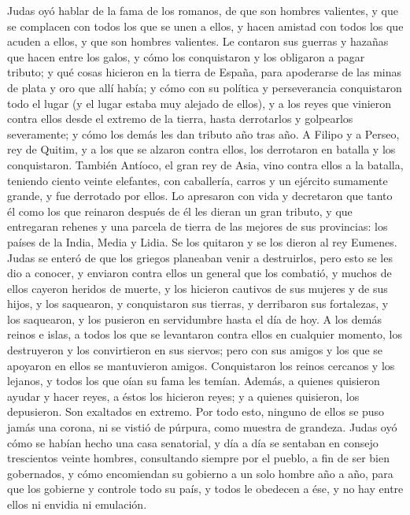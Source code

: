  Judas oyó hablar de la fama de los romanos, de que son
hombres valientes, y que se complacen con todos los que se unen a ellos,
y hacen amistad con todos los que acuden a ellos,  y que
son hombres valientes. Le contaron sus guerras y hazañas que hacen entre
los galos, y cómo los conquistaron y los obligaron a pagar tributo;
 y qué cosas hicieron en la tierra de España, para
apoderarse de las minas de plata y oro que allí había;  y
cómo con su política y perseverancia conquistaron todo el lugar (y el
lugar estaba muy alejado de ellos), y a los reyes que vinieron contra
ellos desde el extremo de la tierra, hasta derrotarlos y golpearlos
severamente; y cómo los demás les dan tributo año tras año.
 A Filipo y a Perseo, rey de Quitim, y a los que se
alzaron contra ellos, los derrotaron en batalla y los conquistaron.
 También Antíoco, el gran rey de Asia, vino contra ellos a
la batalla, teniendo ciento veinte elefantes, con caballería, carros y
un ejército sumamente grande, y fue derrotado por ellos. 
Lo apresaron con vida y decretaron que tanto él como los que reinaron
después de él les dieran un gran tributo, y que entregaran rehenes y una
parcela de tierra de las mejores de sus provincias:  los
países de la India, Media y Lidia. Se los quitaron y se los dieron al
rey Eumenes.  Judas se enteró de que los griegos planeaban
venir a destruirlos,  pero esto se les dio a conocer, y
enviaron contra ellos un general que los combatió, y muchos de ellos
cayeron heridos de muerte, y los hicieron cautivos de sus mujeres y de
sus hijos, y los saquearon, y conquistaron sus tierras, y derribaron sus
fortalezas, y los saquearon, y los pusieron en servidumbre hasta el día
de hoy.  A los demás reinos e islas, a todos los que se
levantaron contra ellos en cualquier momento, los destruyeron y los
convirtieron en sus siervos;  pero con sus amigos y los
que se apoyaron en ellos se mantuvieron amigos. Conquistaron los reinos
cercanos y los lejanos, y todos los que oían su fama les temían.
 Además, a quienes quisieron ayudar y hacer reyes, a
éstos los hicieron reyes; y a quienes quisieron, los depusieron. Son
exaltados en extremo.  Por todo esto, ninguno de ellos se
puso jamás una corona, ni se vistió de púrpura, como muestra de
grandeza.  Judas oyó cómo se habían hecho una casa
senatorial, y día a día se sentaban en consejo trescientos veinte
hombres, consultando siempre por el pueblo, a fin de ser bien
gobernados,  y cómo encomiendan su gobierno a un solo
hombre año a año, para que los gobierne y controle todo su país, y todos
le obedecen a ése, y no hay entre ellos ni envidia ni emulación.

